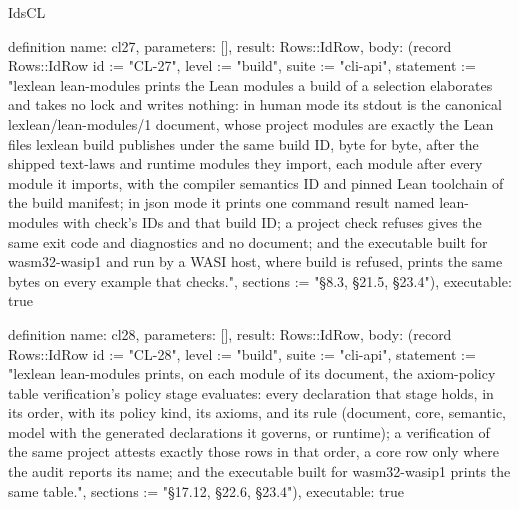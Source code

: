 \begin{lexlean}{IdsCL}
\begin{semanticmodule}
definition{
  name: cl27,
  parameters: [],
  result: Rows::IdRow,
  body: (record Rows::IdRow {id := "CL-27", level := "build", suite := "cli-api", statement := "lexlean lean-modules prints the Lean modules a build of a selection elaborates and takes no lock and writes nothing: in human mode its stdout is the canonical lexlean/lean-modules/1 document, whose project modules are exactly the Lean files lexlean build publishes under the same build ID, byte for byte, after the shipped text-laws and runtime modules they import, each module after every module it imports, with the compiler semantics ID and pinned Lean toolchain of the build manifest; in json mode it prints one command result named lean-modules with check's IDs and that build ID; a project check refuses gives the same exit code and diagnostics and no document; and the executable built for wasm32-wasip1 and run by a WASI host, where build is refused, prints the same bytes on every example that checks.", sections := "§8.3, §21.5, §23.4"}),
  executable: true
}

definition{
  name: cl28,
  parameters: [],
  result: Rows::IdRow,
  body: (record Rows::IdRow {id := "CL-28", level := "build", suite := "cli-api", statement := "lexlean lean-modules prints, on each module of its document, the axiom-policy table verification's policy stage evaluates: every declaration that stage holds, in its order, with its policy kind, its axioms, and its rule (document, core, semantic, model with the generated declarations it governs, or runtime); a verification of the same project attests exactly those rows in that order, a core row only where the audit reports its name; and the executable built for wasm32-wasip1 prints the same table.", sections := "§17.12, §22.6, §23.4"}),
  executable: true
}
\end{semanticmodule}
\end{lexlean}
